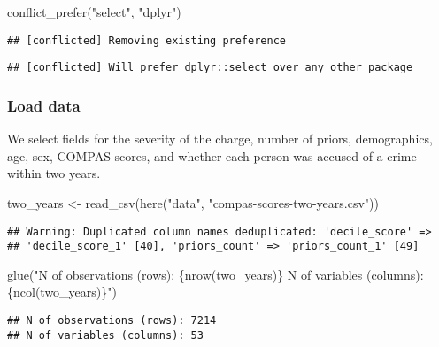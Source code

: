 \documentclass[
]{book}
\newenvironment{Shaded}{\begin{snugshade}}{\end{snugshade}}
\newcommand{\FunctionTok}[1]{\textcolor[rgb]{0.00,0.00,0.00}{#1}}
\newcommand{\NormalTok}[1]{#1}
\newcommand{\OtherTok}[1]{\textcolor[rgb]{0.56,0.35,0.01}{#1}}
\newcommand{\StringTok}[1]{\textcolor[rgb]{0.31,0.60,0.02}{#1}}
\begin{document}
\begin{Shaded}
\begin{Highlighting}[]
\FunctionTok{conflict\_prefer}\NormalTok{(}\StringTok{"select"}\NormalTok{, }\StringTok{"dplyr"}\NormalTok{) }
\end{Highlighting}
\end{Shaded}

\begin{verbatim}
## [conflicted] Removing existing preference
\end{verbatim}

\begin{verbatim}
## [conflicted] Will prefer dplyr::select over any other package
\end{verbatim}

\hypertarget{load-data}{%
\subsubsection{Load data}\label{load-data}}

We select fields for the severity of the charge, number of priors, demographics, age, sex, COMPAS scores, and whether each person was accused of a crime within two years.

\begin{Shaded}
\begin{Highlighting}[]
\NormalTok{two\_years }\OtherTok{\textless{}{-}} \FunctionTok{read\_csv}\NormalTok{(}\FunctionTok{here}\NormalTok{(}\StringTok{"data"}\NormalTok{, }\StringTok{"compas{-}scores{-}two{-}years.csv"}\NormalTok{))}
\end{Highlighting}
\end{Shaded}

\begin{verbatim}
## Warning: Duplicated column names deduplicated: 'decile_score' =>
## 'decile_score_1' [40], 'priors_count' => 'priors_count_1' [49]
\end{verbatim}

\begin{Shaded}
\begin{Highlighting}[]
\FunctionTok{glue}\NormalTok{(}\StringTok{"N of observations (rows): \{nrow(two\_years)\}}
\StringTok{      N of variables (columns): \{ncol(two\_years)\}"}\NormalTok{)}
\end{Highlighting}
\end{Shaded}

\begin{verbatim}
## N of observations (rows): 7214
## N of variables (columns): 53
\end{verbatim}
\end{document}
